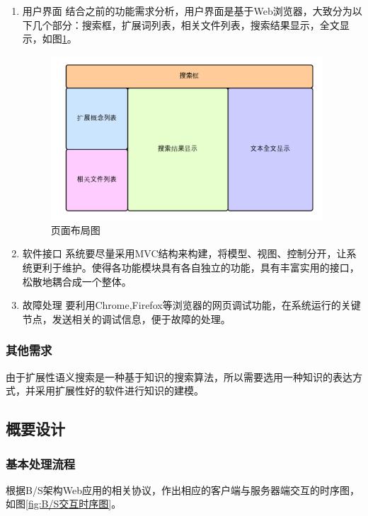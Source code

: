 \documentclass[12pt,a4paper]{article}
\begin{document}
\begin{enumerate}
\item 用户界面
结合之前的功能需求分析，用户界面是基于Web浏览器，大致分为以下几个部分：搜索框，扩展词列表，相关文件列表，搜索结果显示，全文显示，如图\ref{fig:页面布局图}。

	\begin{figure}[htbp] 
	\centering\includegraphics[width=4in]{fig/WindowsDistribution.png} 
	\caption{页面布局图}\label{fig:页面布局图}
	\end{figure} 

\item 软件接口
系统要尽量采用MVC结构来构建，将模型、视图、控制分开，让系统更利于维护。使得各功能模块具有各自独立的功能，具有丰富实用的接口，松散地耦合成一个整体。

\item 故障处理
要利用Chrome,Firefox等浏览器的网页调试功能，在系统运行的关键节点，发送相关的调试信息，便于故障的处理。
	
\end{enumerate}		
		
		\subsubsection{其他需求}
	由于扩展性语义搜索是一种基于知识的搜索算法，所以需要选用一种知识的表达方式，并采用扩展性好的软件进行知识的建模。
	
	\subsection{概要设计}
		\subsubsection{基本处理流程}
	
	根据B/S架构Web应用的相关协议，作出相应的客户端与服务器端交互的时序图，如图\ref{fig:B/S交互时序图}。
	
\end{document}
